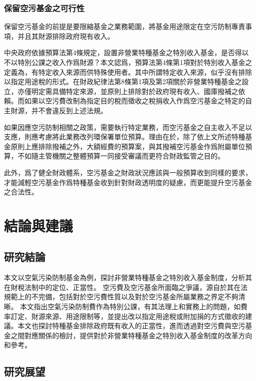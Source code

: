 \documentclass[12pt,a4paper]{article}
\begin{document}
\subsubsection{保留空污基金之可行性}

保留空污基金的前提是要限縮基金之業務範圍，將基金用途限定在空污防制專責事項，并且其財源排除政府現有收入。

中央政府依據預算法第4條規定，設置非營業特種基金之特別收入基金，是否得以不以特別公課之收入作爲財源？本文認爲，預算法第4條第1項對於特別收入基金之定義為，有特定收入來源而供特殊使用者。其中所謂特定收入來源，似乎沒有排除以指定用途稅的形式。在財政紀律法第8條第1項及第2項關於非營業特種基金之設立，亦僅明定需具備特定來源，並原則上排除對於政府現有收入、國庫撥補之依賴。而如果以空污費改制為指定目的稅而徵收之稅捐收入作爲空污基金之特定的自主財源，并不會違反到上述法規。

如果因應空污防制相關之政策，需要執行特定業務，而空污基金之自主收入不足以支應，則應考慮將此業務改列環保署單位預算。理由在於，除了依上文所述特種基金原則上應排除撥補之外，大額經費的預算案，與其撥補空污基金作爲附屬單位預算，不如隨主管機關之整體預算一同接受審議而更符合財政監管之目的。

此外，爲了健全財政體系，空污基金之財政狀況應該與一般預算收到同樣的要求，才能減輕空污基金作爲特種基金收到針對財政透明度的疑慮，而更能提升空污基金之合法性。

\section{結論與建議}

\subsection{研究結論}

本文以空氣污染防制基金為例，探討非營業特種基金之特別收入基金制度，分析其在財稅法制中的定位、正當性。
空污費及空污基金所面臨之爭議，源自於其在法規範上的不完備，包括對於空污費性質以及對於空污基金所屬業務之界定不夠清晰。
本文指出空氣污染防制費作為特別公課，有其法理上和實務上的問題，如費率訂定、財源來源、用途限制等，並提出改以指定用途稅或附加捐的方式徵收的建議。本文也探討特種基金排除政府既有收入的正當性，進而透過對空污費與空污基金之間對應關係的檢討，提供對於非營業特種基金之特別收入基金制度的改革方向和參考。



\subsection{研究展望}
\end{document}
